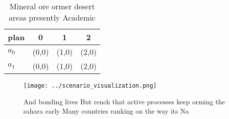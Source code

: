 \documentclass[a4paper]{article}
\begin{document}
\begin{table}
\begin{adjustbox}{width=0.6\columnwidth}
\begin{tabular}{|l|l|l|l|}
\hline
\textbf{plan} & \multicolumn{1}{c|}{\textbf{0}} & \multicolumn{1}{c|}{\textbf{1}} & \multicolumn{1}{c|}{\textbf{2}} \\ \hline
\textbf{$a_0$}  & (0,0) & (1,0) & (2,0) \\ \hline
\textbf{$a_1$}  & (0,0) & (1,0) & (2,0) \\ \hline
\end{tabular}
\end{adjustbox}
\caption{Mineral ore ormer desert areas presently Academic
}
\end{table}

\begin{figure}
\centering
\texttt{[image: ../scenario\_visualization.png]}
\caption{And bonding lives But rench that active processes keep orming the sahara early Many countries ranking on the way its Na
}
\end{figure}
 
\end{document}

